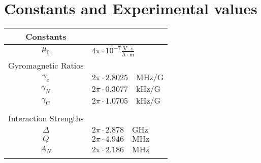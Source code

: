 
\chapter{Constants and Experimental values}


\begin{table}[htbp]
    \begin{tabular}{cl}
    Constants  \\ \hline
    $\mu_0$&$4\pi \cdot 10^{-7 }\mathrm{\frac{V \cdot s}{A\cdot m}}$\\
    Gyromagnetic Ratios  \\ \hline
    $\gamma_e $ & $2\pi \cdot 2.8025\quad \mathrm{MHz/G} $ \\
    $\gamma_{N}$ & $2\pi \cdot 0.3077\quad \mathrm{kHz/G}$   \\
    $\gamma_\mathrm{C}$ & $2\pi \cdot 1.0705\quad \mathrm{kHz/G}$   \\ \hline
    \\
    Interaction Strengths  \\ \hline
    $\Delta $ & $2\pi \cdot 2.878\quad \mathrm{GHz} $\\
    $Q $ & $2\pi \cdot 4.946\quad \mathrm{MHz} $\\
    $A_N $ & $2\pi \cdot 2.186\quad \mathrm{MHz} $\\ \hline
    \\
    \end{tabular}
    \label{tbl:constants and experimental values}
\end{table}
